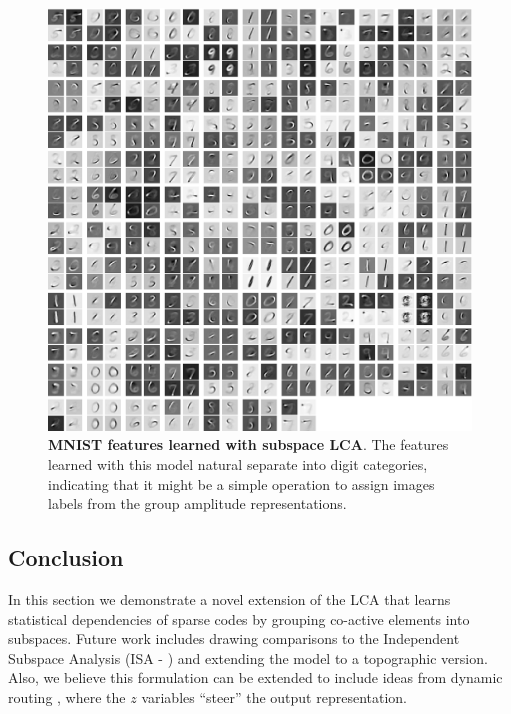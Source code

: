\begin{figure}[h]
    \centering
    \includegraphics[width=\textwidth]{figures/subspace_lca_mnist_features.png}
    \caption{\textbf{MNIST features learned with subspace LCA}. The features learned with this model natural separate into digit categories, indicating that it might be a simple operation to assign images labels from the group amplitude representations.}
    \label{fig:ch3_subspace_lca_mnist_features}
\end{figure}

\subsection{Conclusion}
In this section we demonstrate a novel extension of the LCA that learns statistical dependencies of sparse codes by grouping co-active elements into subspaces. Future work includes drawing comparisons to the Independent Subspace Analysis (ISA - \cite{hyvarinen2000emergence}) and extending the model to a topographic version. Also, we believe this formulation can be extended to include ideas from dynamic routing \parencite{olshausen1993neurobiological}, where the $z$ variables ``steer'' the output representation.